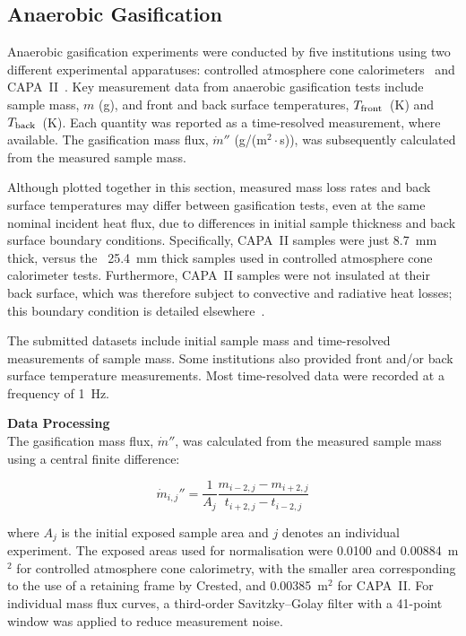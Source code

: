 \documentclass{book}
\begin{document}
\newpage
\subsection{Anaerobic Gasification}

Anaerobic gasification experiments were conducted by five institutions using two different experimental apparatuses: controlled atmosphere cone calorimeters~\cite{babrauskas1992cone} and CAPA~II~\cite{swann2017controlled}. Key measurement data from anaerobic gasification tests include sample mass, $m$ (g), and front and back surface temperatures, $T_{\rm front}$~(K) and $T_{\rm back}$~(K). Each quantity was reported as a time-resolved measurement, where available. The gasification mass flux, $\dot{m}''$ (g/(m$^2 \cdot$s)), was subsequently calculated from the measured sample mass.

Although plotted together in this section, measured mass loss rates and back surface temperatures may differ between gasification tests, even at the same nominal incident heat flux, due to differences in initial sample thickness and back surface boundary conditions. Specifically, CAPA~II samples were just 8.7~mm thick, versus the ~25.4~mm thick samples used in controlled atmosphere cone calorimeter tests. Furthermore, CAPA~II samples were not insulated at their back surface, which was therefore subject to convective and radiative heat losses; this boundary condition is detailed elsewhere~\cite{swann2017controlled}.

The submitted datasets include initial sample mass and time-resolved measurements of sample mass. Some institutions also provided front and/or back surface temperature measurements. Most time-resolved data were recorded at a frequency of 1~Hz.

\textbf{Data Processing}\\
The gasification mass flux, $\dot{m}''$, was calculated from the measured sample mass using a central finite difference:

\begin{equation}
\dot{m}_{i,j}'' = \frac{1}{A_j}
\frac{m_{i-2,j}-m_{i+2,j}}{t_{i+2,j}-t_{i-2,j}}
\end{equation}

\noindent where $A_j$ is the initial exposed sample area and $j$ denotes an individual experiment. The exposed areas used for normalisation were 0.0100 and 0.00884~m$^2$ for controlled atmosphere cone calorimetry, with the smaller area corresponding to the use of a retaining frame by Crested, and 0.00385~m$^2$ for CAPA~II. For individual mass flux curves, a third-order Savitzky--Golay filter with a 41-point window was applied to reduce measurement noise.
\end{document}
